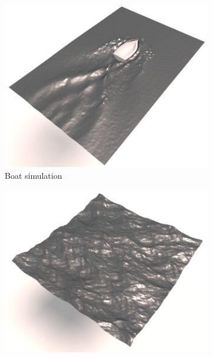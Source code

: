 \begin{figure}[th!]
     \centering
    \begin{subfigure}[b]{0.48\linewidth}
    \centering
\includegraphics[width=\textwidth]{images/fluidsculpting-mig2016/results/boatTraversal.png}
\caption{\label{fig:result_detail:boat}\scriptsize{Boat simulation}}
    \end{subfigure}
    \hspace{0.1cm}
    \begin{subfigure}[b]{0.48\linewidth}
    \centering
\includegraphics[width=\textwidth]{images/fluidsculpting-mig2016/results/highResOcean.png}

\end{subfigure}
\end{figure}
